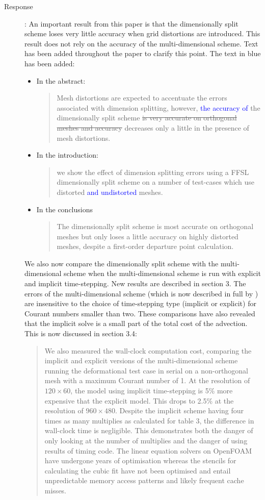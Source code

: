 \documentclass[12pt]{article}
\begin{document}
\begin{description}
\item [Response]:
An important result from this paper is that the dimensionally split scheme loses very little accuracy when grid distortions are introduced. This result does not rely on the accuracy of the multi-dimensional scheme. Text has been added throughout the paper to clarify this point. The text in blue has been added:
\begin{itemize}
\item In the abstract:
\begin{quote}
Mesh distortions are expected to accentuate the errors associated with dimension splitting, however, \textcolor{blue}{the accuracy of} the dimensionally split scheme \sout{is very accurate on orthogonal meshes and accuracy} decreases only a little in the presence of mesh distortions.
\end{quote}
\item In the introduction:
\begin{quote}
we show the effect of dimension splitting errors using a FFSL dimensionally split scheme on a number of test-cases which use distorted \textcolor{blue}{and undistorted} meshes.
\end{quote}
\item In the conclusions
\begin{quote}
The dimensionally split scheme is most accurate on orthogonal meshes but only loses a little accuracy on highly distorted meshes, despite a first-order departure point calculation.
\end{quote}
\end{itemize}

We also now compare the dimensionally split scheme with the multi-dimensional scheme when the multi-dimensional scheme is run with explicit and implicit time-stepping. New results are described in section 3. The errors of the multi-dimensional scheme (which is now described in full by \cite{SWMD17}) are insensitive to the choice of time-stepping type (implicit or explicit) for Courant numbers smaller than two. These comparisons have also revealed that the implicit solve is a small part of the total cost of the advection. This is now discussed in section 3.4:

\begin{quote}
We also measured the wall-clock computation cost, comparing the implicit and explicit versions of the multi-dimensional scheme running the deformational test case in serial on a non-orthogonal mesh with a maximum Courant number of 1. At the resolution of $120\times 60$, the model using implicit time-stepping is 5\% 
more expensive that the explicit model. This drops to 2.5\%
at the resolution of $960\times 480$. Despite the implicit scheme having four times as many multiplies as calculated for table 3, the difference in wall-clock time is negligible. This demonstrates both the danger of only looking at the number of multiplies and the danger of using results of timing code. The linear equation solvers on OpenFOAM have undergone years of optimisation whereas the stencils for calculating the cubic fit have not been optimised and entail unpredictable memory access patterns and likely frequent cache misses. 
\end{quote}


\end{description}
\end{document}
